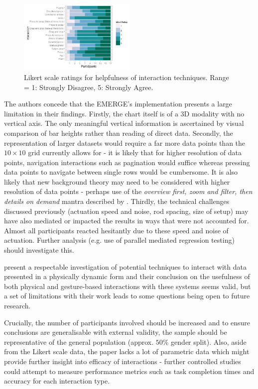 \documentclass[11pt]{article}
\begin{document}
\begin{figure}[H]
\centering
\includegraphics[width=0.5\textwidth]{img/taher2015-likert.png} 
\caption{Likert scale ratings for helpfulness of interaction
techniques. Range = 1: Strongly Disagree, 5: Strongly Agree.}\label{fig:taher2015-likert}
\end{figure}

The authors concede that the EMERGE's implementation presents a large limitation in their findings. Firstly, the chart itself is of a 3D modality with no vertical axis. The only meaningful vertical information is ascertained by visual comparison of bar heights rather than reading of direct data. Secondly, the representation of larger datasets would require a far more data points than the $10\times10$ grid currently allows for - it is likely that for higher resolution of data points, navigation interactions such as pagination would suffice whereas pressing data points to navigate between single rows would be cumbersome. It is also likely that new background theory may need to be considered with higher resolution of data points - perhaps use of the \textit{overview first, zoom and filter, then details on demand} mantra described by \citet{shneiderman1997}. Thirdly, the technical challenges discussed previously (actuation speed and noise, rod spacing, size of setup) may have also mediated or impacted the results in ways that were not accounted for. Almost all participants reacted hesitantly due to these speed and noise of actuation. Further analysis (e.g. use of parallel mediated regression testing) should investigate this.

\citet{taher2015} present a respectable investigation of potential techniques to interact with data presented in a physically dynamic form and their conclusion on the usefulness of both physical and gesture-based interactions with these systems seems valid, but a set of limitations with their work leads to some questions being open to future research. 

Crucially, the number of participants involved should be increased and to ensure conclusions are generalisable with external validity, the sample should be representative of the general population (approx. $50\%$ gender split). Also, aside from the Likert scale data, the paper lacks a lot of parametric data which might provide further insight into efficacy of interactions - further controlled studies could attempt to measure performance metrics such as task completion times and accuracy for each interaction type.
\end{document}
